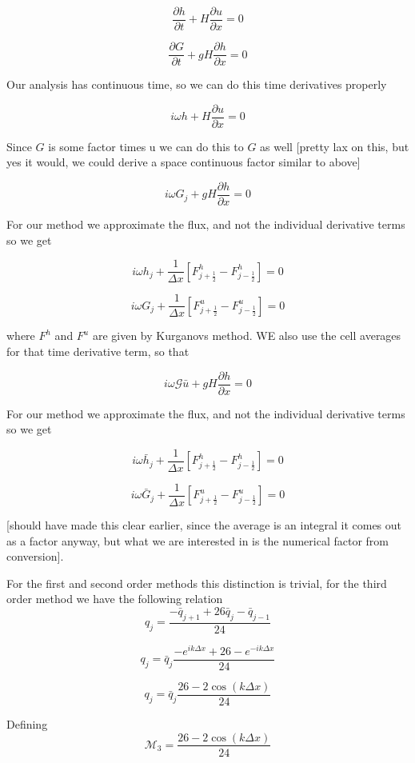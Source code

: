 \documentclass[12pt]{article}
\begin{document}
\[\frac{\partial  h}{\partial  t} + H\frac{\partial  u}{\partial  x} = 0 \]

\[\frac{\partial  G}{\partial  t} + gH\frac{\partial  h}{\partial  x}   = 0 \]

Our analysis has continuous time, so we can do this time derivatives properly 

\[i\omega h + H\frac{\partial  u}{\partial  x} = 0 \]

Since $G$ is some factor times u we can do this to $G$ as well [pretty lax on this, but yes it would, we could derive a space continuous factor similar to above]

\[ i\omega G_j + gH\frac{\partial  h}{\partial  x}   = 0 \]

For our method we approximate the flux, and not the individual derivative terms so we get

\[i\omega h_j + \frac{1}{\Delta x}\left[F^h_{j + \frac{1}{2}} - F^h_{j - \frac{1}{2}}\right] = 0 \]

\[i\omega G_j + \frac{1}{\Delta x}\left[F^u_{j + \frac{1}{2}} - F^u_{j - \frac{1}{2}}\right] = 0 \]

where $F^h$ and $F^u$ are given by Kurganovs method. WE also use the cell averages for that time derivative term, so that 

\[ i\omega \mathcal{G} \bar{u} + gH\frac{\partial  h}{\partial  x}   = 0 \]

For our method we approximate the flux, and not the individual derivative terms so we get

\[i\omega \bar{h}_j + \frac{1}{\Delta x}\left[F^h_{j + \frac{1}{2}} - F^h_{j - \frac{1}{2}}\right] = 0 \]

\[i\omega \bar{G}_j + \frac{1}{\Delta x}\left[F^u_{j + \frac{1}{2}} - F^u_{j - \frac{1}{2}}\right] = 0 \]

[should have made this clear earlier, since the average is an integral it comes out as a factor anyway, but what we are interested in is the numerical factor from conversion].

For the first and second order methods this distinction is trivial, for the third order method we have the following relation
\[q_{j} =\frac{-\bar{q}_{j+1} +26\bar{q}_{j}  -\bar{q}_{j-1}}{24} \]

\[q_{j} = \bar{q}_{j}\frac{-e^{ik\Delta x} +26  -e^{-ik\Delta x}}{24} \]

\[q_{j} = \bar{q}_{j}\frac{26  -2\cos\left(k\Delta x\right)}{24} \]

Defining
\[\mathcal{M}_3= \frac{26  -2\cos\left(k\Delta x\right)}{24}\]
\end{document}
